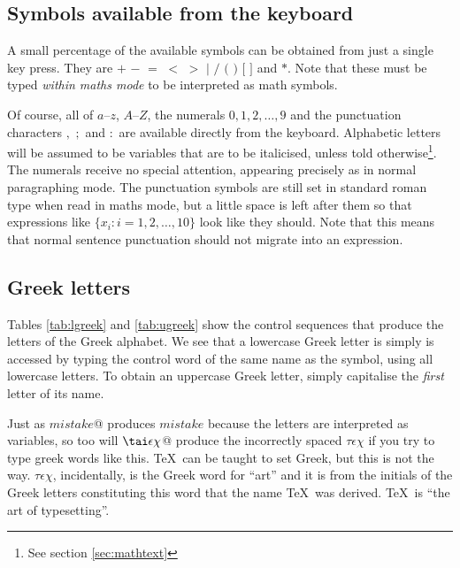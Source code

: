 \subsection{Symbols available from the keyboard}
A small percentage of the available symbols can be obtained from just
a single key press.  They are $+$ $-$ $=$ $<$ $>$ $|$ $/$ $($ $)$
$[$ $]$ and $*$.  Note that these must be typed {\em within maths mode\/}
to be interpreted as math symbols.

Of course, all of $a$--$z$, $A$--$Z$, the numerals $0, 1, 2, \ldots, 9$ and
the punctuation characters $,$ $;$ and $:$ are available directly from the keyboard.
Alphabetic letters will be assumed to be variables that are to be
italicised, unless told otherwise\footnote{See section \ref{sec:mathtext}}.
The numerals receive no special attention, appearing precisely as in
normal paragraphing mode.  The punctuation symbols
are still set in standard roman type when read in maths mode, but a little
space is left after them so that expressions like $\{x_i : i=1,2,\ldots,10\}$
look like they should.  Note that this means that normal sentence punctuation
should not migrate into an expression.

\subsection{Greek letters}

\newcommand{\ds}[1]{$\csname#1\endcsname$ & \tt\bs #1 }
\newcommand{\dsf}[4]{\ds{#1}&\ds{#2}&\ds{#3}&\ds{#4}}
\newcommand{\dst}[3]{\ds{#1}&\ds{#2}&\ds{#3}}

Tables \ref{tab:lgreek} and \ref{tab:ugreek} show the control sequences that produce the
letters of the Greek alphabet.  We see that a lowercase Greek letter
is simply is accessed by typing the control word of the same name
as the symbol, using all lowercase letters.  To obtain an uppercase
Greek letter, simply capitalise the {\em first\/} letter of its name.

Just as \verb@$mistake$@ produces $mistake$ because the letters
are interpreted as variables, so too will \verb@$\tai \epsilon \chi$@
produce the incorrectly spaced $\tau \epsilon \chi$ if you try to
type greek words like this.  \TeX\ can be taught to set Greek, but
this is not the way.  $\tau\!\epsilon\!\chi$, %
incidentally, is the Greek word for ``art'' and it is from the initials of the
Greek letters constituting this word that the name \TeX\ was derived.
\TeX\ is ``the art of typesetting''.


